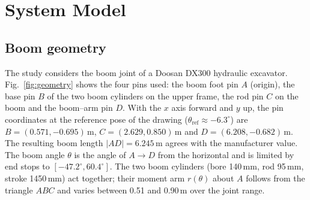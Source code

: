 
\section{System Model}
\label{sec:model}

\subsection{Boom geometry}
The study considers the boom joint of a Doosan DX300 hydraulic excavator. Fig.~\ref{fig:geometry}
shows the four pins used: the boom foot pin $A$ (origin), the base pin $B$ of the two boom
cylinders on the upper frame, the rod pin $C$ on the boom and the boom--arm pin $D$. With the
$x$ axis forward and $y$ up, the pin coordinates at the reference pose of the drawing
($\theta_\mathrm{ref}\approx-6.3^\circ$) are
$B=(0.571,-0.695)$\,m, $C=(2.629,0.850)$\,m and $D=(6.208,-0.682)$\,m. %
The resulting boom length $|AD|=6.245$\,m agrees with the manufacturer value. %
The boom angle $\theta$ is the angle of $A\!\to\!D$ from the horizontal and is limited by end
stops to $[-47.2^\circ, 60.4^\circ]$. %
The two boom cylinders (bore 140\,mm, rod 95\,mm, stroke 1450\,mm) act together; %
their moment arm $r(\theta)$ about $A$ follows from the triangle $ABC$ and varies between
0.51 and 0.90\,m over the joint range.

